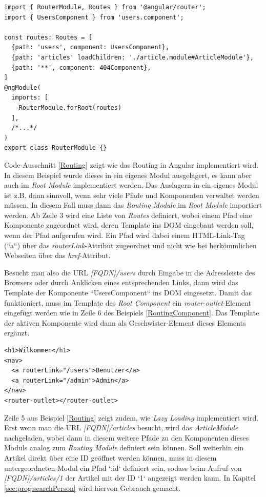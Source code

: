 \begin{lstlisting}[float, floatplacement=h, style=htmlcssjs, caption={Beispiel eines  \textit{RouterModule}}, label={Routing}]
import { RouterModule, Routes } from '@angular/router';
import { UsersComponent } from 'users.component';

const routes: Routes = [
  {path: 'users', component: UsersComponent},
  {path: 'articles' loadChildren: './article.module#ArticleModule'},
  {path: '**', component: 404Component},
]
@ngModule(
  imports: [
    RouterModule.forRoot(routes)
  ],
  /*...*/
)
export class RouterModule {}
\end{lstlisting}
Code-Ausschnitt \ref{Routing} zeigt wie das Routing in Angular implementiert wird. In diesem Beispiel wurde dieses in ein eigenes Modul ausgelagert, es kann aber auch im \textit{Root Module} implementiert werden. Das Auslagern in ein eigenes Modul ist z.B. dann sinnvoll, wenn sehr viele Pfade und Komponenten verwaltet werden müssen. In diesem Fall muss dann das \textit{Routing Module} im \textit{Root Module} importiert werden. Ab Zeile 3 wird eine Liste von \textit{Routes} definiert, wobei einem Pfad eine Komponente zugeordnet wird, deren Template ins \acs{DOM} eingebaut werden soll, wenn der Pfad aufgerufen wird. Ein Pfad wird dabei einem HTML-Link-Tag (``a``) über das \textit{routerLink}-Attribut zugeordnet und nicht wie bei herkömmlichen Webseiten über das \textit{href}-Attribut.

Besucht man also die URL \textit{[\acs{FQDN}]/users} durch Eingabe in die Adressleiste des Browsers oder durch Anklicken eines entsprechenden Links, dann wird das Template der Komponente ``UsersComponent`` ins \acs{DOM} eingesetzt. Damit das funktioniert, muss im Template des \textit{Root Component} ein \textit{router-outlet}-Element eingefügt werden wie in Zeile 6 des Beispiels \ref{RoutingComponent}. Das Template der aktiven Komponente wird dann als Geschwister-Element dieses Elements ergänzt.
\begin{lstlisting}[float, floatplacement=h, style=htmlcssjs, caption={Beispiel eines Templates für das \textit{Root Component}, um Routing zu ermöglichen.\cite{RouterOutlet}}, label={RoutingComponent}]
<h1>Wilkommen</h1>
<nav>
  <a routerLink="/users">Benutzer</a>
  <a routerLink="/admin">Admin</a>
</nav>
<router-outlet></router-outlet>
\end{lstlisting}
Zeile 5 aus Beispiel \ref{Routing} zeigt zudem, wie \textit{Lazy Loading} implementiert wird. Erst wenn man die URL \textit{[\acs{FQDN}]/articles} besucht, wird das \textit{ArticleModule} nachgeladen, wobei dann in diesem weitere Pfade zu den Komponenten dieses Moduls analog zum \textit{Routing Module} definiert sein können. Soll weiterhin ein Artikel direkt über eine ID geöffnet werden können, muss in diesem untergeordneten Modul ein Pfad `:id` definiert sein, sodass beim Aufruf von \textit{[\acs{FQDN}]/articles/1} der Artikel mit der ID `1` angezeigt werden kann. In Kapitel \ref{sec:prog:searchPerson} wird hiervon Gebrauch gemacht.

